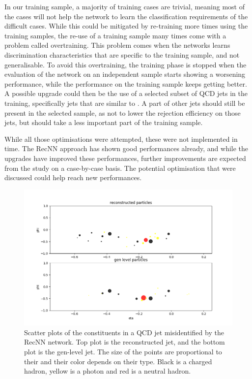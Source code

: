 In our training sample, a majority of training cases are trivial, meaning most of the cases will not help the network to learn the classification requirements of the difficult cases. While this could be mitigated by re-training more times using the training samples, the re-use of a training sample many times come with a problem called overtraining. This problem comes when the networks learns discrimination characteristics that are specific to the training sample, and not generalisable. To avoid this overtraining, the training phase is stopped when the evaluation of the network on an independent sample starts showing a worsening performance, while the performance on the training sample keeps getting better. A possible upgrade could then be the use of a selected subset of QCD jets in the training, specifically jets that are similar to \tauh. A part of other jets should still be present in the selected sample, as not to lower the rejection efficiency on those jets, but should take a less important part of the training sample. 

While all those optimisations were attempted, these were not implemented in time. The RecNN approach has shown good performances already, and while the upgrades have improved these performances, further improvements are expected from the study on a case-by-case basis. The potential optimisation that were discussed could help reach new performances.

\begin{figure}
    \centering
    \includegraphics[width=\textwidth]{Images/display.png}
    \caption{Scatter plots of the constituents in a QCD jet misidentified by the RecNN network. Top plot is the reconstructed jet, and the bottom plot is the gen-level jet. The size of the points are proportional to their \pt and their color depends on their type. Black is a charged hadron, yellow is a photon and red is a neutral hadron.}
    \label{fig:jet_display}
\end{figure}
